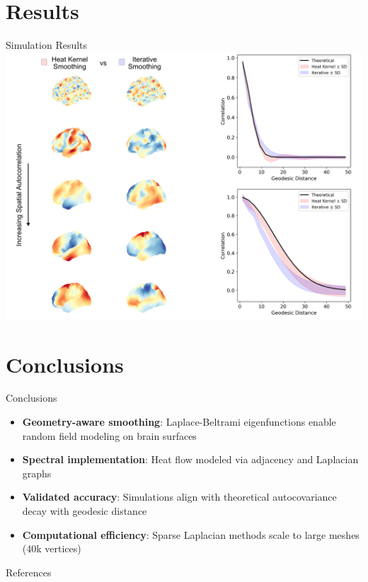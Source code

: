 \documentclass[8pt]{beamer}
\begin{document}
\section{Results}

\begin{frame}{Simulation Results}
\includegraphics[width=1\textwidth]{project/figures/results.png}   
\end{frame}

\section{Conclusions}
\begin{frame}{Conclusions}
    \begin{itemize}
        \item \textbf{Geometry-aware smoothing}: Laplace-Beltrami eigenfunctions enable random field modeling on brain surfaces
        \vspace{0.5cm}
        \item \textbf{Spectral implementation}: Heat flow modeled via adjacency and Laplacian graphs
        \vspace{0.5cm}
        \item \textbf{Validated accuracy}: Simulations align with theoretical autocovariance decay with geodesic distance
        \vspace{0.5cm}
        \item \textbf{Computational efficiency}: Sparse Laplacian methods scale to large meshes (40k vertices)
    \end{itemize}
\end{frame}

\begin{frame}{References}
    \small
    
\end{frame}
\end{document}
